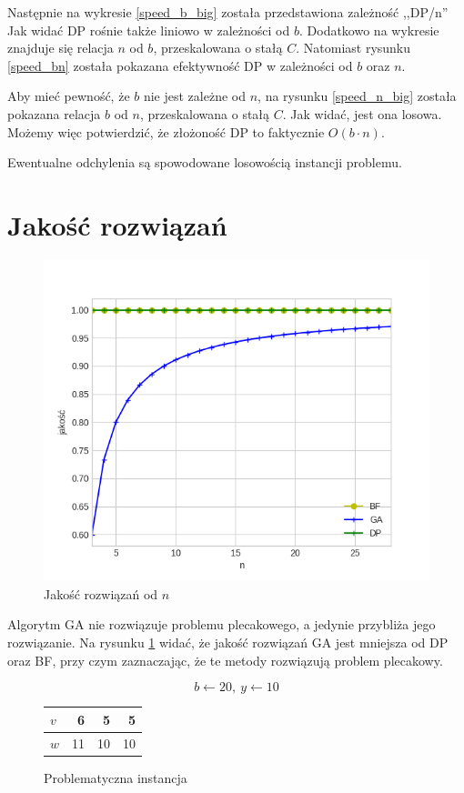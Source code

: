 \documentclass[12pt,twocolumn]{article}
\begin{document}
Następnie na wykresie \ref{speed_b_big} została przedstawiona zależność ,,DP/n'' 
Jak widać DP rośnie także liniowo w zależności od $b$.
Dodatkowo na wykresie znajduje się relacja $n$ od $b$, przeskalowana o stałą $C$.
Natomiast rysunku \ref{speed_bn} została pokazana efektywność DP w zależności od $b$ oraz $n$.

Aby mieć pewność, że $b$ nie jest zależne od $n$, na rysunku \ref{speed_n_big} została
pokazana relacja $b$ od $n$, przeskalowana o stałą $C$.
Jak widać, jest ona losowa.
Możemy więc potwierdzić, że złożoność DP to faktycznie $O(b \cdot n)$.


Ewentualne odchylenia są spowodowane losowością instancji problemu.


\section{Jakość rozwiązań}

\begin{figure}[h]
	\includegraphics[width=\linewidth]{quality.png}
	\caption{Jakość rozwiązań od $n$ \label{quality}}
\end{figure}

Algorytm GA nie rozwiązuje problemu plecakowego, a jedynie przybliża jego rozwiązanie.
Na rysunku \ref{quality} widać, że jakość rozwiązań GA jest mniejsza od DP oraz BF,
przy czym zaznaczając, że te metody rozwiązują problem plecakowy.

\begin{figure}[h]
	$$b \leftarrow 20,\ y \leftarrow 10$$
	\begin{center}
		\begin{tabular}{|l|r|r|r|}
			\hline
			$v$ & 6 & 5 & 5 \\ \hline
			$w$ & 11 & 10 & 10 \\ \hline
		\end{tabular}
	\end{center}
	\caption{Problematyczna instancja \label{evil}}
\end{figure}
\end{document}
